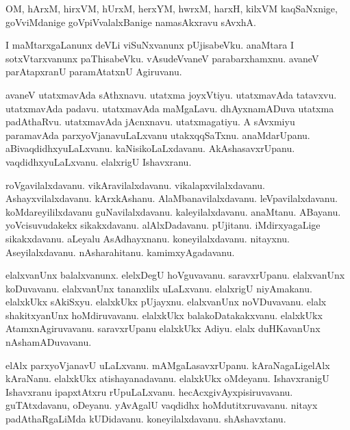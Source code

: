 \documentclass{article}
\begin{document}
\begin{mn}%
OM, hArxM, hirxVM, hUrxM, herxYM, hwrxM, harxH, kilxVM kaqSaNxnige, goVviMdanige goVpiVvalalxBanige 
namasAkxravu sAvxhA.
\end{mn}

\begin{mn}%
I maMtarxgaLanunx deVLi viSuNxvanunx pUjisabeVku. anaMtara I sotxVtarxvanunx paThisabeVku. 
vAsudeVvaneV parabarxhamxnu. avaneV parAtapxranU paramAtatxnU Agiruvanu.
\end{mn}

\begin{mn}%
avaneV utatxmavAda sAthxnavu. utatxma joyxVtiyu. utatxmavAda tatavxvu. utatxmavAda padavu. 
utatxmavAda maMgaLavu. dhAyxnamADuva utatxma padAthaRvu. utatxmavAda jAcnxnavu. utatxmagatiyu. A 
sAvxmiyu paramavAda parxyoVjanavuLaLxvanu utakxqqSaTxnu. anaMdarUpanu. aBivaqdidhxyuLaLxvanu. 
kaNisikoLaLxdavanu. AkAshasavxrUpanu. vaqdidhxyuLaLxvanu. elalxrigU Ishavxranu.
\end{mn}

\begin{mn}%
roVgavilalxdavanu. vikAravilalxdavanu. vikalapxvilalxdavanu. Ashayxvilalxdavanu. kArxkAshanu. 
AlaMbanavilalxdavanu. leVpavilalxdavanu. koMdareyililxdavanu guNavilalxdavanu. kaleyilalxdavanu. 
anaMtanu. ABayanu. yoVcisuvudakekx sikakxdavanu. alAlxDadavanu. pUjitanu. iMdirxyagaLige 
sikakxdavanu. aLeyalu AsAdhayxnanu. koneyilalxdavanu. nitayxnu. Aseyilalxdavanu. nAsharahitanu. 
kamimxyAgadavanu.
\end{mn}

\begin{mn}%
elalxvanUnx balalxvanunx. elelxDegU hoVguvavanu. saravxrUpanu. elalxvanUnx koDuvavanu. elalxvanUnx 
tananxlilx uLaLxvanu. elalxrigU niyAmakanu. elalxkUkx sAkiSxyu. elalxkUkx pUjayxnu. elalxvanUnx 
noVDuvavanu. elalx shakitxyanUnx hoMdiruvavanu. elalxkUkx balakoDatakakxvanu. elalxkUkx 
AtamxnAgiruvavanu. saravxrUpanu elalxkUkx Adiyu. elalx duHKavanUnx nAshamADuvavanu.
\end{mn}

\begin{mn}%
elAlx parxyoVjanavU uLaLxvanu. mAMgaLasavxrUpanu. kAraNagaLigelAlx kAraNanu. elalxkUkx 
atishayanadavanu. elalxkUkx oMdeyanu. IshavxranigU Ishavxranu ipapxtAtxru rUpuLaLxvanu. 
hecAcxgivAyxpisiruvavanu. guTAtxdavanu, oDeyanu. yAvAgalU vaqdidhx hoMdutitxruvavanu. nitayx 
padAthaRgaLiMda kUDidavanu. koneyilalxdavanu. shAshavxtanu.
\end{mn}
\end{document}
